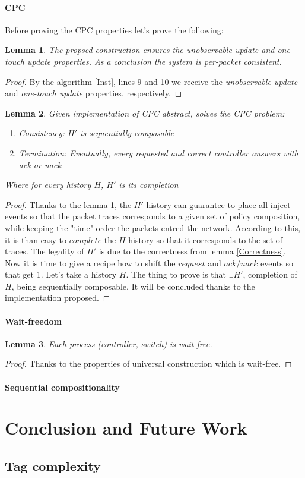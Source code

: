 \documentclass{article}
\newtheorem{lemma}{Lemma}
\theoremstyle{remark}
\begin{document}
\paragraph{CPC} \label{consistencyPC}
Before proving the CPC properties let's prove the following:
\begin{lemma}\label{per-packet consistency} The propsed construction ensures the \emph{unobservable update} and \emph{one-touch update} properties. As a conclusion the system is \emph{per-packet consistent}.
\end{lemma}
\begin{proof}
By the algorithm \ref{Inst}, lines 9 and 10 we receive the \emph{unobservable update} and \emph{one-touch update} properties, respectively.
\end{proof}
\begin{lemma}
Given implementation of CPC abstract, solves the CPC problem:
\begin{enumerate}
\item Consistency: \emph{$H'$ is sequentially composable}
\item Termination: \emph{Eventually, every requested and correct controller answers with} ack or nack
\end{enumerate}
Where for every history $H$, $H'$ is its completion
\end{lemma}
\begin{proof}
Thanks to the lemma \ref{per-packet consistency}, the $H'$ history can guarantee to place all inject events so that the packet traces corresponds to a given set of policy composition, while keeping the "time" order the packets entred the network. According to this, it is than easy to $complete$ the $H$ history so that it corresponds to the set of traces.
The legality of $H'$ is due to the correctness from lemma \ref{Correctness}. Now it is time to give a recipe how to shift the  $request$ and $ack/nack$ events so that get 
1. Let's take a history $H$. The thing to prove is that $\exists H'$, completion of $H$, being sequentially composable. It will be concluded thanks to the implementation proposed.
\end{proof}
\paragraph{Wait-freedom}
\begin{lemma}
Each process (controller, switch) is wait-free.
\end{lemma}
\begin{proof}
Thanks to the properties of universal construction which is wait-free.
\end{proof}
\paragraph{Sequential compositionality}
%
%
\section{Conclusion and Future Work}
\subsection{Tag complexity}



\end{document}
